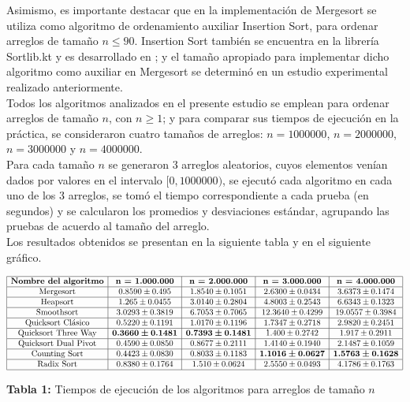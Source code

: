 \documentclass{article}
\begin{document}
	Asimismo, es importante destacar que en la implementaci\'on de Mergesort se utiliza como algoritmo de ordenamiento auxiliar Insertion Sort, para ordenar arreglos de tamaño $n \leq 90$. Insertion Sort tambi\'en se encuentra en la librer\'ia Sortlib.kt y es desarrollado en \cite{6}; y el tamaño apropiado para implementar dicho algoritmo como auxiliar en Mergesort se determin\'o en un estudio experimental realizado anteriormente.\\
	
	Todos los algoritmos analizados en el presente estudio se emplean para ordenar arreglos de tamaño $n$, con $n \geq 1$; y para comparar sus tiempos de ejecuci\'on en la pr\'actica, se consideraron cuatro tamaños de arreglos: $n = 1000000$, $n = 2000000$, $n = 3000000$ y $n = 4000000$.\\
	
	Para cada tamaño $n$ se generaron $3$ arreglos aleatorios, cuyos elementos ven\'ian dados por valores en el intervalo $[0,1000000)$, se ejecut\'o cada algoritmo en cada uno de los $3$ arreglos, se tom\'o el tiempo correspondiente a cada prueba (en segundos) y se calcularon los promedios y desviaciones est\'andar, agrupando las pruebas de acuerdo al tamaño del arreglo.\\
	
	Los resultados obtenidos se presentan en la siguiente tabla y en el siguiente gr\'afico. 

	$$\begin{array}{|c|c|c|c|c|}
		\hline
		\textbf{Nombre del algoritmo} & \textbf{n = 1.000.000} & \textbf{n = 2.000.000} & \textbf{n = 3.000.000} & \textbf{n = 4.000.000}\\
		\hline
		\text{Mergesort} & 0.8590 \pm 0.495 & 1.8540 \pm 0.1051 & 2.6300\pm 0.0434 & 3.6373 \pm 0.1474 \\
		\hline
		\text{Heapsort} & 1.265 \pm 0.0455 & 3.0140 \pm 0.2804 & 4.8003 \pm 0.2543 & 6.6343 \pm 0.1323\\
		\hline
		\text{Smoothsort} & 3.0293 \pm 0.3819 & 6.7053 \pm 0.7065 & 12.3640 \pm 0.4299 & 19.0557 \pm 0.3984\\
		\hline
		\text{Quicksort Cl\'asico} & 0.5220 \pm 0.1191 & 1.0170 \pm 0.1196 & 1.7347 \pm 0.2718 & 2.9820 \pm 0.2451\\
		\hline
		\text{Quicksort Three Way} & \boldsymbol{0.3660 \pm 0.1481} & \boldsymbol{0.7393 \pm 0.1481} & 1.400\pm 0.2742 & 1.917 \pm 0.2911\\
		\hline
		\text{Quicksort Dual Pivot} & 0.4590 \pm 0.0850 & 0.8677 \pm 0.2111 & 1.4140\pm 0.1940 & 2.1487 \pm 0.1059\\
		\hline
		\text{Counting Sort} &  0.4423 \pm 0.0830 & 0.8033 \pm 0.1183 & \boldsymbol{1.1016\pm 0.0627} & \boldsymbol{1.5763 \pm 0.1628} \\
		\hline
		\text{Radix Sort} & 0.8380 \pm 0.1764 & 1.510 \pm 0.0624 & 2.5550\pm 0.0493 & 4.1786 \pm 0.1763\\
		\hline
	\end{array}$$\:
	\begin{center}
		\textbf{Tabla 1:} Tiempos de ejecuci\'on de los algoritmos para arreglos de tamaño $n$
	\end{center}\:
	
\end{document}
